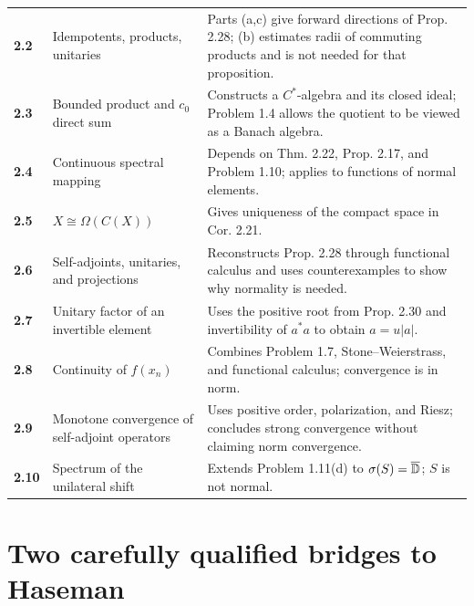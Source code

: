 \begin{longtable}{>{\bfseries}p{1.3cm}p{4.3cm}p{8.2cm}}
2.2 & Idempotents, products, unitaries & Parts (a,c) give forward directions of Prop. 2.28; (b) estimates radii of commuting products and is not needed for that proposition.\\
2.3 & Bounded product and $c_0$ direct sum & Constructs a $C^*$-algebra and its closed ideal; Problem 1.4 allows the quotient to be viewed as a Banach algebra.\\
2.4 & Continuous spectral mapping & Depends on Thm. 2.22, Prop. 2.17, and Problem 1.10; applies to functions of normal elements.\\
2.5 & $X\cong\Omega(C(X))$ & Gives uniqueness of the compact space in Cor. 2.21.\\
2.6 & Self-adjoints, unitaries, and projections & Reconstructs Prop. 2.28 through functional calculus and uses counterexamples to show why normality is needed.\\
2.7 & Unitary factor of an invertible element & Uses the positive root from Prop. 2.30 and invertibility of $a^*a$ to obtain $a=u|a|$.\\
2.8 & Continuity of $f(x_n)$ & Combines Problem 1.7, Stone--Weierstrass, and functional calculus; convergence is in norm.\\
2.9 & Monotone convergence of self-adjoint operators & Uses positive order, polarization, and Riesz; concludes strong convergence without claiming norm convergence.\\
2.10 & Spectrum of the unilateral shift & Extends Problem 1.11(d) to $\sigma(S)=\overline{\mathbb D}$; $S$ is not normal.\\
\bottomrule
\end{longtable}
\normalsize

\section{Two carefully qualified bridges to Haseman}

\begin{center}
\end{center}

